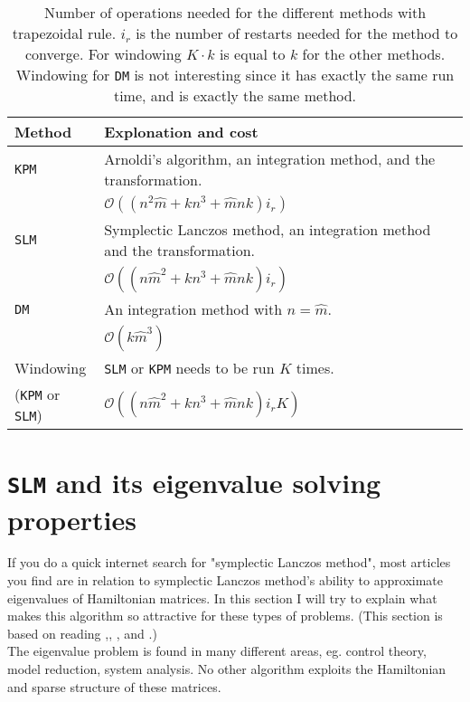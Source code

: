 \begin{table}
\caption{ Number of operations needed for the different methods with trapezoidal rule. $i_r$ is the number of restarts needed for the method to converge. For windowing $K\cdot k$ is equal to $k$ for the other methods. Windowing for \texttt{DM} is not interesting since it has exactly the same run time, and is exactly the same method. }
\centering
\begin{tabular}{l | l}
Method & Explonation and cost \\
\hline
\texttt{KPM} & Arnoldi's algorithm, an integration method, and the transformation.
\\ & $ \mathcal{O}((n^2 \hat{m} + k n^3 + \hat{m}nk)i_r)$ \\ 
\texttt{SLM} & Symplectic Lanczos method, an integration method and the transformation. 
\\ & $ \mathcal{O}((n \hat{m}^2 + k n^3 + \hat{m}nk)i_r) $  \\
\texttt{DM} & An integration method with $n = \hat{m}$. 
\\  & $\mathcal{O}(k\hat{m}^3)$ \\
Windowing  & \texttt{SLM} or \texttt{KPM} needs to be run $K$ times. \\ (\texttt{KPM} or \texttt{SLM}) & $\mathcal{O}((n \hat{m}^2 + k n^3 + \hat{m}nk)i_r K)$ \\
\end{tabular}
\label{tab:cc}

\end{table}

\section{\texttt{SLM} and its eigenvalue solving properties} %
If you do a quick internet search for "symplectic Lanczos method", most articles you find are in relation to symplectic Lanczos method's ability to approximate eigenvalues of Hamiltonian matrices. In this section I will try to explain what makes this algorithm so attractive for these types of problems. (This section is based on reading \cite{SLM1},\cite{SLM2}, \cite{SLM3}, and \cite{SLM4}.) \\

\noindent The eigenvalue problem is found in many different areas, eg. control theory, model reduction, system analysis. No other algorithm exploits the Hamiltonian and sparse structure of these matrices. \\

